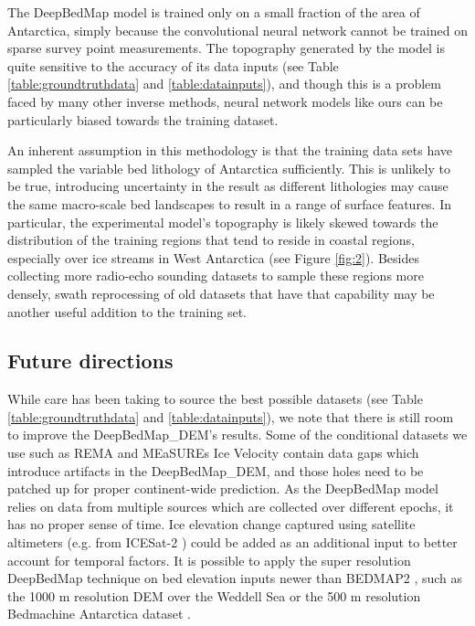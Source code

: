 \documentclass[tc, manuscript]{copernicus}
\begin{document}
The DeepBedMap model is trained only on a small fraction of the area of Antarctica, simply because the convolutional neural network cannot be trained on sparse survey point measurements.
The topography generated by the model is quite sensitive to the accuracy of its data inputs (see Table \ref{table:groundtruthdata} and \ref{table:datainputs}), and though this is a problem faced by many other inverse methods, neural network models like ours can be particularly biased towards the training dataset.

An inherent assumption in this methodology is that the training data sets have sampled the variable bed lithology of Antarctica \citep{CoxGeoMAPdatasetAntarctic2018} sufficiently.
This is unlikely to be true, introducing uncertainty in the result as different lithologies may cause the same macro-scale bed landscapes to result in a range of surface features.
In particular, the experimental model's topography is likely skewed towards the distribution of the training regions that tend to reside in coastal regions, especially over ice streams in West Antarctica (see Figure \ref{fig:2}).
Besides collecting more radio-echo sounding datasets to sample these regions more densely, swath reprocessing of old datasets that have that capability \citep{HolschuhSwathtopographyfuture2019} may be another useful addition to the training set.

\subsection{Future directions}

While care has been taking to source the best possible datasets (see Table \ref{table:groundtruthdata} and \ref{table:datainputs}), we note that there is still room to improve the DeepBedMap\_DEM's results.
Some of the conditional datasets we use such as REMA \citep{HowatReferenceElevationModel2019} and MEaSUREs Ice Velocity \citep{MouginotMEaSUREsPhaseMap2019} contain data gaps which introduce artifacts in the DeepBedMap\_DEM, and those holes need to be patched up for proper continent-wide prediction.
As the DeepBedMap model relies on data from multiple sources which are collected over different epochs, it has no proper sense of time.
Ice elevation change captured using satellite altimeters (e.g. from ICESat-2 \citep{MarkusIceCloudland2017}) could be added as an additional input to better account for temporal factors.
It is possible to apply the super resolution DeepBedMap technique on bed elevation inputs newer than BEDMAP2 \citep{FretwellBedmap2improvedice2013}, such as the 1000 m resolution DEM over the Weddell Sea \citep{Jeofry1KmBedTopography2017} or the 500 m resolution Bedmachine Antarctica dataset \citep{MorlighemMEaSUREsBedMachineAntarctica2019}.
\end{document}
